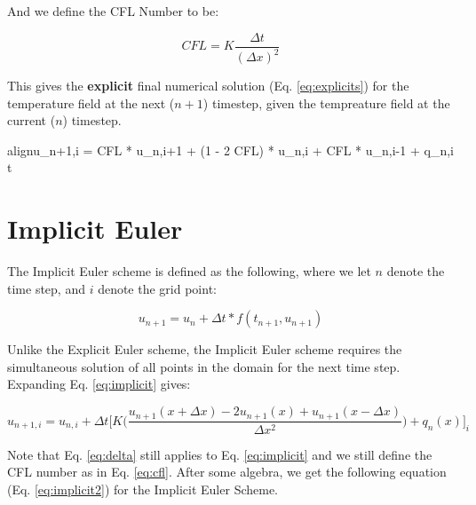 \documentclass[10pt, letter, showtrims]{extarticle}
\newcommand{\boxedeq}[2]{\begin{empheq}[box={\fboxsep=6pt\fbox}]{align}\label{#1}#2\end{empheq}}
\begin{document}
		\noindent
		And we define the CFL Number to be:
		
		\begin{equation}
		\label{eq:cfl}
			CFL = K \frac{\Delta t}{(\Delta x)^{2}}
		\end{equation}
		
		\noindent
		This gives the \textbf{explicit} final numerical solution (Eq. \ref{eq:explicits}) for the temperature field at the next ($n + 1$) timestep, given the tempreature field at the current ($n$) timestep.
		
		\boxedeq{eq:explicits}{u_{n+1,i} = CFL * u_{n,i+1} + (1 - 2 CFL) * u_{n,i} + CFL * u_{n,i-1} + q_{n,i} \Delta t}
		
		\pagebreak
		
		\noindent
		\section{Implicit Euler}
		
		\noindent
		The Implicit Euler scheme is defined as the following, where we let $n$ denote the time step, and $i$ denote the grid point:
		
		\begin{equation}
		\label{eq:implicit}
			u_{n+1} = u_{n} + \Delta t * f(t_{n+1}, u_{n+1})
		\end{equation}
		
		\noindent
		Unlike the Explicit Euler scheme, the Implicit Euler scheme requires the simultaneous solution of all points in the domain for the next time step. \\
		
		\noindent
		Expanding Eq. \ref{eq:implicit} gives:
		
		
		\begin{equation}
			u_{n+1,i} = u_{n,i} + \Delta t \big[ K \big(\frac{u_{n+1}(x + \Delta x) - 2 u_{n+1} (x) + u_{n+1} (x - \Delta x)}{\Delta x^{2}} \big) + q_{n}(x)\big]_{i}
		\end{equation}
	
		\noindent
		Note that Eq. \ref{eq:delta} still applies to Eq. \ref{eq:implicit} and we still define the CFL number as in Eq. \ref{eq:cfl}. After some algebra, we get the following equation (Eq. \ref{eq:implicit2}) for the Implicit Euler Scheme.
		
\end{document}
